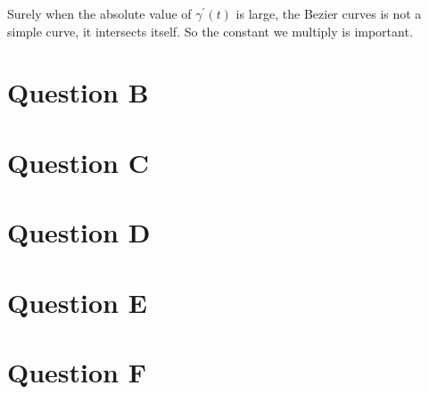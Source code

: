 \documentclass[a4paper]{article}
\begin{document}
Surely when the absolute value of $\gamma^{\prime}(t)$ is large, the Bezier curves is not a simple curve, it intersects itself. So the constant we multiply is important.

\begin{appendices}
	\section{Question B}
	\label{appendices::QB}
	

	\section{Question C}
	\label{appendices::QC}
	

	\section{Question D}
	\label{appendices::QD}
	

	\section{Question E}
	\label{appendices::QE}
	

	\section{Question F}
	\label{appendices::QF}
	
\end{appendices}
\end{document}
